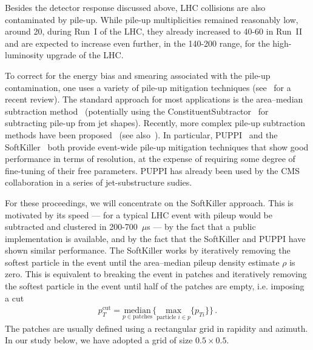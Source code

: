 \documentclass[11pt]{cernrep}
\begin{document}
Besides the detector response discussed above, LHC collisions are also
contaminated by pile-up.
%
While pile-up multiplicities remained reasonably low, around 20, during Run~I of
the LHC, they already increased to 40-60 in Run~II and are expected to
increase even further, in the 140-200 range, for the high-luminosity
upgrade of the LHC.

To correct for the energy bias and smearing associated with the
pile-up contamination, one uses a variety of pile-up mitigation
techniques (see~\cite{Soyez:2018opl} for a recent review). The
standard approach for most applications is the area--median
subtraction
method~\cite{Cacciari:2007fd,Cacciari:2008gn,AlcarazMaestre:2012vp,Soyez:2012hv}
(potentially using the ConstituentSubtractor~\cite{Berta:2014eza} for
subtracting pile-up from jet shapes). Recently, more complex pile-up
subtraction methods have been
proposed~\cite{Krohn:2013lba,Bertolini:2014bba,Cacciari:2014gra} (see
also~\cite{Tseng:2013dva,Cacciari:2014jta}). In particular,
PUPPI~\cite{Bertolini:2014bba} and the
SoftKiller~\cite{Cacciari:2014gra} both provide event-wide pile-up
mitigation techniques that show good performance in terms of
resolution, at the expense of requiring some degree of fine-tuning of
their free parameters.
%
PUPPI has already been used by the CMS collaboration in a series of
jet-substructure sudies.

For these proceedings, we will concentrate on the SoftKiller approach.
This is motivated by its speed --- for a typical LHC event with pileup
would be subtracted and clustered in 200-700~$\mu$s --- by the fact
that a public implementation is available, and by the fact that the
SoftKiller and PUPPI have shown similar performance.
%
The SoftKiller works by iteratively removing the softest particle in
the event until the area--median pileup density estimate $\rho$ is
zero. This is equivalent to breaking the event in patches and
iteratively removing the softest particle in the event until half of
the patches are empty, i.e. imposing a cut
%
\begin{align}
p_T^{\text{cut}}=\underset{p \in \text{patches}}{\text{median}}\Big\{
  \underset{\text{particle }i\in p}{\text{max}}\{ p_{Ti}\}\Big\}\,.
\end{align}
%
The patches are usually defined using a rectangular grid in rapidity
and azimuth. In our study below, we have adopted a grid of size
$0.5\times 0.5$.
\end{document}
